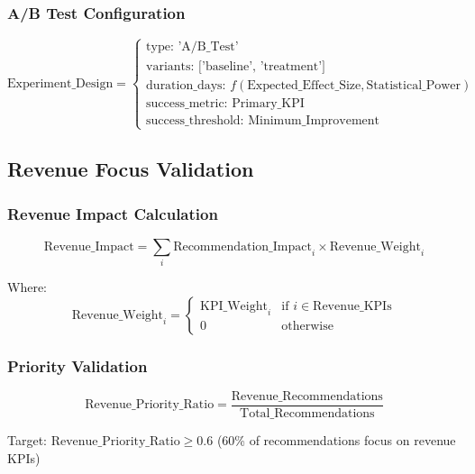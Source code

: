 \documentclass[12pt,a4paper]{article}
\begin{document}
\subsubsection{A/B Test Configuration}

\begin{equation}
\text{Experiment\_Design} = \begin{cases}
\text{type: 'A/B\_Test'} \\
\text{variants: ['baseline', 'treatment']} \\
\text{duration\_days: } f(\text{Expected\_Effect\_Size}, \text{Statistical\_Power}) \\
\text{success\_metric: Primary\_KPI} \\
\text{success\_threshold: Minimum\_Improvement}
\end{cases}
\end{equation}

\subsection{Revenue Focus Validation}

\subsubsection{Revenue Impact Calculation}

\begin{equation}
\text{Revenue\_Impact} = \sum_{i} \text{Recommendation\_Impact}_i \times \text{Revenue\_Weight}_i
\end{equation}

Where:
\begin{equation}
\text{Revenue\_Weight}_i = \begin{cases}
\text{KPI\_Weight}_i & \text{if } i \in \text{Revenue\_KPIs} \\
0 & \text{otherwise}
\end{cases}
\end{equation}

\subsubsection{Priority Validation}

\begin{equation}
\text{Revenue\_Priority\_Ratio} = \frac{\text{Revenue\_Recommendations}}{\text{Total\_Recommendations}}
\end{equation}

Target: $\text{Revenue\_Priority\_Ratio} \geq 0.6$ (60\% of recommendations focus on revenue KPIs)
\end{document}
